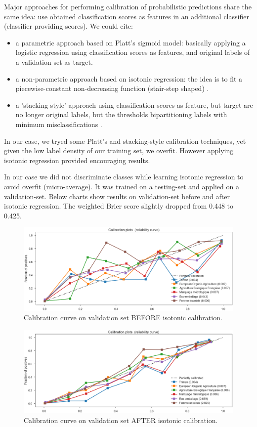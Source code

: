 Major approaches for performing calibration of probabilistic predictions share the same idea: use obtained classification scores as features in an additional classifier (classifier providing scores). We could cite: 
\begin{itemize}
	\item a parametric approach based on Platt’s sigmoid model: basically applying a logistic regression using classification scores as features, and original labels of a validation set as target.
	\item a non-parametric approach based on isotonic regression: the idea is to fit a piecewise-constant non-decreasing function (stair-step shaped) \cite{Calibration}.
	\item a 'stacking-style' approach using classification scores as feature, but target are no longer original labels, but the thresholds bipartitioning labels with minimum misclassifications \cite{MultilabelReview}.
\end{itemize}

In our case, we tryed some Platt's and stacking-style calibration techniques, yet given the low label density of our training set, we overfit. However applying isotonic regression provided encouraging results. 

In our case we did not discriminate classes while learning isotonic regression to avoid overfit (micro-average). It was trained on a testing-set and applied on a validation-set. Below charts show results on validation-set before and after isotonic regression. The weighted Brier score slightly dropped from 0.448 to 0.425.

\begin{figure}[H]
\centering
\includegraphics[scale=0.40]{./images/calibration/calibration_val_before.png}
\caption{Calibration curve on validation set BEFORE isotonic calibration.}
\end{figure}

\begin{figure}[H]
\centering
\includegraphics[scale=0.40]{./images/calibration/calibration_val_after.png}
\caption{Calibration curve on validation set AFTER isotonic calibration.}
\end{figure}



